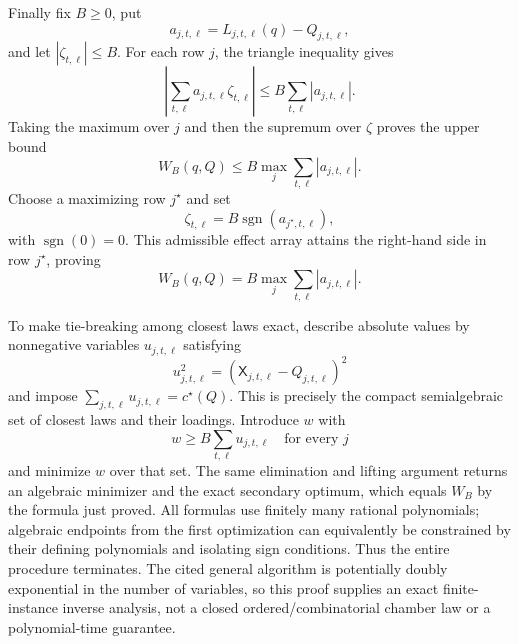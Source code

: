 Finally fix \(B\geq0\), put
\[
 a_{j,t,\ell}=L_{j,t,\ell}(q)-Q_{j,t,\ell},
\]
and let \(|\zeta_{t,\ell}|\leq B\).  For each row \(j\), the triangle inequality gives
\[
 \left|\sum_{t,\ell}a_{j,t,\ell}\zeta_{t,\ell}\right|
 \leq B\sum_{t,\ell}|a_{j,t,\ell}|.
\]
Taking the maximum over \(j\) and then the supremum over \(\zeta\) proves the upper bound
\[
 W_B(q,Q)\leq
 B\max_j\sum_{t,\ell}|a_{j,t,\ell}|.
\]
Choose a maximizing row \(j^{\star}\) and set
\[
 \zeta_{t,\ell}=B\operatorname{sgn}(a_{j^{\star},t,\ell}),
\]
with \(\operatorname{sgn}(0)=0\).  This admissible effect array attains the right-hand side in row \(j^{\star}\), proving
\[
 W_B(q,Q)=B\max_j\sum_{t,\ell}|a_{j,t,\ell}|.
\]

To make tie-breaking among closest laws exact, describe absolute values by nonnegative variables \(u_{j,t,\ell}\) satisfying
\[
 u_{j,t,\ell}^2=(\mathsf X_{j,t,\ell}-Q_{j,t,\ell})^2
\]
and impose \(\sum_{j,t,\ell}u_{j,t,\ell}=c^{\star}(Q)\).  This is precisely the compact semialgebraic set of closest laws and their loadings.  Introduce \(w\) with
\[
 w\geq B\sum_{t,\ell}u_{j,t,\ell}
 \quad\text{for every }j
\]
and minimize \(w\) over that set.  The same elimination and lifting argument returns an algebraic minimizer and the exact secondary optimum, which equals \(W_B\) by the formula just proved.  All formulas use finitely many rational polynomials; algebraic endpoints from the first optimization can equivalently be constrained by their defining polynomials and isolating sign conditions.  Thus the entire procedure terminates.  The cited general algorithm is potentially doubly exponential in the number of variables, so this proof supplies an exact finite-instance inverse analysis, not a closed ordered/combinatorial chamber law or a polynomial-time guarantee.
